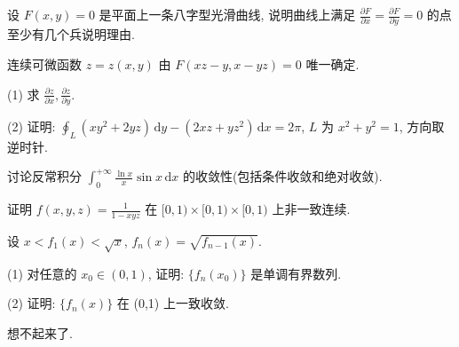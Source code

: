 \par{}
设 $F(x, y) = 0$ 是平面上一条八字型光滑曲线, 说明曲线上满足 $\frac{\partial F}{\partial x} = \frac{\partial F}{\partial y} = 0$ 的点至少有几个兵说明理由.\par
\par{}
连续可微函数 $z = z(x, y)$ 由 $F(xz - y, x - yz) = 0$ 唯一确定.\par
(1) 求  $\frac{\partial z}{\partial x}, \frac{\partial z}{\partial y}.$\par
(2) 证明: $\oint_{L} (xy^{2} + 2yz) \, \mathrm{d}y - (2xz + yz^{2}) \, \mathrm{d}x = 2\pi$, $L$ 为 $x^{2} + y^{2} = 1$, 方向取逆时针.\par
\par{}
讨论反常积分 $\int_0^{+\infty} \frac{\ln x}{x} \sin x \, \mathrm{d}x$ 的收敛性(包括条件收敛和绝对收敛).\par
\par{}
证明 $f(x, y, z) = \frac{1}{1 - xyz}$ 在 $[0, 1) \times [0, 1) \times [0, 1)$ 上非一致连续.\par
\par{}
设 $x < f_{1}(x) < \sqrt{x}$, $f_{n}(x) = \sqrt{f_{n-1}(x)}$.\par
(1) 对任意的 $x_0 \in (0,1)$, 证明: $\{f_n(x_0)\}$ 是单调有界数列.\par
(2) 证明: $\{f_n(x)\}$ 在 (0,1) 上一致收敛.\par
\par{}
想不起来了.\par
